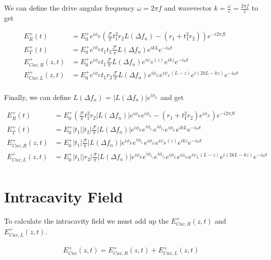 \documentclass[12pt]{article}
\begin{document}
We can define the drive angular frequency $\omega = 2\pi f$ and wavevector $k = \frac{\omega}{c} = \frac{2\pi f}{c}$ to get

\begin{align}
E_R^+(t) &= E_0^+ e^{i\phi_E}\left(\frac{\mathcal{F}}{\pi} t_1^2 r_2 L(\Delta f_n) - (r_1 + t_1^2 r_2)\right) e^{-i2\pi ft}\\
E_T^+(t) &= E_0^+ e^{i\phi_E}t_1t_2 \frac{\mathcal{F}}{\pi} L(\Delta f_n) e^{i kL} e^{-i \omega t}\\
E_{Cav,R}^+(z,t) &= E_0^+ e^{i\phi_E}t_1  \frac{\mathcal{F}}{\pi} L(\Delta f_n)  e^{i \psi_R(z)}e^{i kz} e^{-i\omega t}\\
E_{Cav,L}^+(z,t) &= E_0^+ e^{i\phi_E}t_1r_2 \frac{\mathcal{F}}{\pi} L(\Delta f_n) e^{i \phi_G} e^{i\psi_L(L-z)} e^{i (2kL - kz)} e^{-i\omega t}\\
\end{align}

Finally, we can define $L(\Delta f_n)$ = $|L(\Delta f_n)|e^{i\phi_L}$ and get

\begin{align}
E_R^+(t) &= E_0^+\left(\frac{\mathcal{F}}{\pi} t_1^2 r_2 |L(\Delta f_n)|e^{i\phi_E}e^{i\phi_L} - (r_1 + t_1^2 r_2)e^{i\phi_E}\right) e^{-i2\pi ft}\\
E_T^+(t) &= E_0^+|t_1||t_2| \frac{\mathcal{F}}{\pi} |L(\Delta f_n)|e^{i\phi_E}e^{i\phi_{t_1}}e^{i\phi_{t_2}}e^{i\phi_L} e^{i kL} e^{-i \omega t}\\
E_{Cav,R}^+(z,t) &= E_0^+|t_1|  \frac{\mathcal{F}}{\pi} |L(\Delta f_n)|e^{i\phi_E}e^{i\phi_{t_1}}e^{i\phi_L}  e^{i \psi_R(z)}e^{i kz} e^{-i\omega t}\\
E_{Cav,L}^+(z,t) &= E_0^+|t_1||r_2| \frac{\mathcal{F}}{\pi} |L(\Delta f_n)|e^{i\phi_E}e^{i\phi_{t_1}} e^{i\phi_{r_2}}e^{i\phi_L} e^{i \phi_G} e^{i\psi_L(L-z)} e^{i (2kL - kz)} e^{-i\omega t}\\
\end{align}

\section{Intracavity Field}

To calculate the intracavity field we must add up the $E_{Cav,R}^+(z,t)$ and $E_{Cav,L}^+(z,t)$.

\begin{align}
E_{Cav}^+(z,t) = E_{Cav,R}^+(z,t) + E_{Cav,L}^+(z,t)
\end{align}
\end{document}
